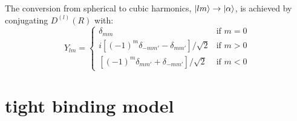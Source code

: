 \documentclass[twocolumn,showpacs,preprintnumbers,superscriptaddress,prb,floatfix,aps,10pt]{revtex4-1}
\newcommand*{\wignerDl}{D^{(l)}(R)}
\begin{document}
The conversion from spherical to cubic harmonics, $\ket{lm} \rightarrow \ket{\alpha}$, is achieved by conjugating $\wignerDl$ with:
\begin{equation}
\label{eq:cubic_harmonics}
Y_{lm} = 
\begin{cases}
\delta_{mm}                                      & \text{if } m = 0 \\
 i[(-1)^{m}\delta_{-mm'}-\delta_{ mm'}]/\sqrt{2} & \text{if } m > 0 \\
  [(-1)^{m}\delta_{ mm'}+\delta_{-mm'}]/\sqrt{2} & \text{if } m < 0
\end{cases}
\end{equation}




%
%
\section{tight binding model}
\label{appendix:tb}
\end{document}
